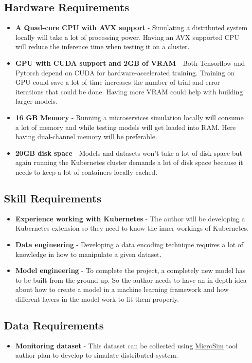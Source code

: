 \subsection{Hardware Requirements}
\begin{itemize}[noitemsep,nolistsep] 
    \item \textbf{A Quad-core CPU with AVX support} - Simulating a distributed system locally will take a lot of processing power. Having an AVX supported CPU will reduce the inference time when testing it on a cluster.
    \item \textbf{GPU with CUDA support and 2GB of VRAM} - Both Tensorflow and Pytorch depend on CUDA for hardware-accelerated training. Training on GPU could save a lot of time increases the number of trial and error iterations that could be done. Having more VRAM could help with building larger models.
    \item \textbf{16 GB Memory} - Running a microservices simulation locally will consume a lot of memory and while testing models will get loaded into RAM. Here having dual-channel memory will be preferable. 
    \item \textbf{20GB disk space} - Models and datasets won't take a lot of disk space but again running the Kubernetes cluster demands a lot of disk space because it needs to keep a lot of containers locally cached.
\end{itemize}

\subsection{Skill Requirements}
\begin{itemize}[noitemsep,nolistsep] 
    \item \textbf{Experience working with Kubernetes} - The author will be developing a Kubernetes extension so they need to know the inner workings of Kubernetes.
    \item \textbf{Data engineering} -  Developing a data encoding technique requires a lot of knowledge in how to manipulate a given dataset.
    \item \textbf{Model engineering} - To complete the project, a completely new model has to be built from the ground up. So the author needs to have an in-depth idea about how to create a model in a machine learning framework and how different layers in the model work to fit them properly. 
\end{itemize}

\subsection{Data Requirements}
\begin{itemize}[noitemsep,nolistsep] 
\item \textbf{Monitoring dataset} -  This dataset can be collected using \hyperref[microsim]{MicroSim} tool author plan to develop to simulate distributed system.
\end{itemize}

